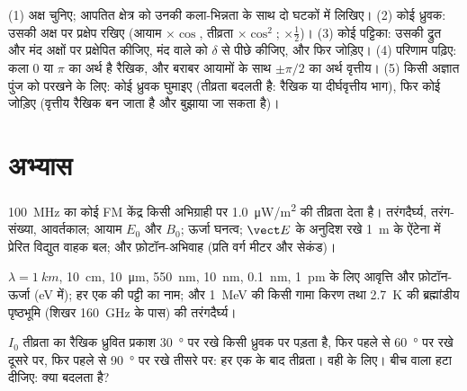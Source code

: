 \begin{method}[प्रकाशिकी में किसी ध्रुवण का पीछा करना]\label{met:b2:plane-waves-polarization:method}
(1) अक्ष चुनिए; आपतित क्षेत्र को उनकी कला-भिन्नता के साथ दो घटकों में
लिखिए। (2) कोई ध्रुवक: उसकी अक्ष पर प्रक्षेप रखिए
(आयाम $\times\cos$, तीव्रता $\times\cos^2$; 
$\times\tfrac12$)। (3) कोई पट्टिका: उसकी द्रुत और मंद अक्षों पर प्रक्षेपित कीजिए, मंद वाले को
$\delta$ से पीछे कीजिए, और फिर जोड़िए। (4) परिणाम पढ़िए: कला $0$ या $\pi$ का अर्थ
है रैखिक, और बराबर आयामों के साथ $\pm\pi/2$ का अर्थ वृत्तीय। (5) किसी
अज्ञात पुंज को परखने के लिए: कोई ध्रुवक घुमाइए (तीव्रता बदलती है: रैखिक या
दीर्घवृत्तीय भाग), फिर कोई  जोड़िए (वृत्तीय रैखिक बन
जाता है और बुझाया जा सकता है)।
\end{method}

\section{अभ्यास}

\begin{exercise}[$\star$]\label{exo:b2:plane-waves-polarization:1}
\qty{100}{MHz} का कोई FM केंद्र किसी अभिग्राही पर
\qty{1.0}{\micro W/m^2} की तीव्रता देता है। तरंगदैर्घ्य, तरंग-संख्या, आवर्तकाल; आयाम $E_0$ और
$B_0$; ऊर्जा घनत्व; $\vect E$ के अनुदिश रखे \qty{1}{m} के ऐंटेना में प्रेरित
विद्युत वाहक बल; और फ़ोटॉन-अभिवाह (प्रति वर्ग मीटर और सेकंड)।
\end{exercise}

\begin{exercise}[$\star$]\label{exo:b2:plane-waves-polarization:2}
$\lambda = \qty{1}{km}$, \qty{10}{cm}, \qty{10}{\micro m}, \qty{550}{nm}, \qty{10}{nm},
\qty{0.1}{nm}, \qty{1}{pm} के लिए आवृत्ति और फ़ोटॉन-ऊर्जा (eV में); हर एक की
पट्टी का नाम; और \qty{1}{MeV} की किसी गामा किरण तथा \qty{2.7}{K} की
ब्रह्मांडीय पृष्ठभूमि (शिखर \qty{160}{GHz} के पास) की तरंगदैर्घ्य।
\end{exercise}

\begin{exercise}[$\star$]\label{exo:b2:plane-waves-polarization:3}
$I_0$ तीव्रता का रैखिक ध्रुवित प्रकाश \qty{30}{\degree} पर रखे किसी ध्रुवक पर
पड़ता है, फिर पहले से \qty{60}{\degree} पर रखे दूसरे पर, फिर पहले से
\qty{90}{\degree} पर रखे तीसरे पर: हर एक के बाद तीव्रता। वही
 के लिए। बीच वाला हटा दीजिए: क्या बदलता है?
\end{exercise}


